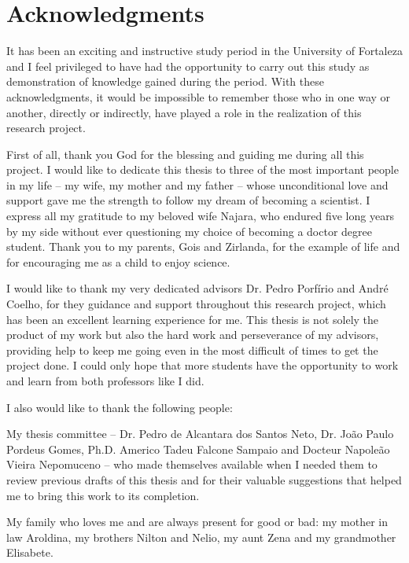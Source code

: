 \chapter*{Acknowledgments} 



It has been an exciting and instructive study period in the University of Fortaleza and I
feel privileged to have had the opportunity to carry out this study as demonstration of
knowledge gained during the period. With these acknowledgments, it would be impossible to remember those who in one way or another, directly or indirectly, have played a role in the realization of this research project. 

First of all, thank you God for the blessing and guiding me during all this project. I would like to dedicate this thesis to three of the most important people in my life
– my wife, my mother and my father – whose unconditional love and support gave me the
strength to follow my dream of becoming a scientist. I express all my gratitude to my beloved wife Najara, who endured five long years by my side without ever questioning my choice of becoming a doctor degree student. Thank you to my parents, Gois and Zirlanda,  for the example of life and for encouraging me as a child to enjoy science.

I would like to thank my very dedicated advisors Dr. Pedro Porfírio and André Coelho, for they guidance and support throughout this research project, which has been an excellent
learning experience for me. This thesis is not solely the product of my work but also the hard work and perseverance of my advisors, providing  help to keep me going even in the most difficult of times to get the project done. I could only hope that more students have the opportunity to work and learn from both professors like I did.

I also would like to thank the following people:

My thesis committee – Dr. Pedro de Alcantara dos Santos Neto, Dr. João Paulo Pordeus Gomes, Ph.D. Americo Tadeu Falcone Sampaio and Docteur Napoleão Vieira Nepomuceno – who made themselves available when I needed them to review previous drafts of this thesis and for their valuable suggestions that helped me to bring this work to its completion.

My family who loves me and are always present for good or bad: my mother in law Aroldina, my brothers Nilton and Nelio, my aunt Zena and my grandmother Elisabete.

